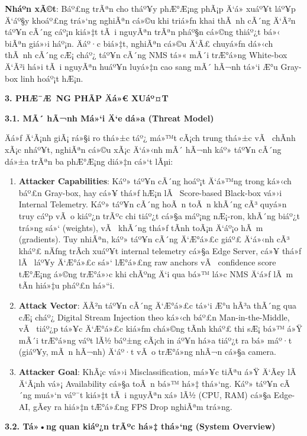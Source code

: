 \documentclass[]{article}
\begin{document}
\textbf{Nháº­n xÃ©t}: Báº£ng trÃªn cho tháº¥y phÆ°Æ¡ng phÃ¡p Ä‘á» xuáº¥t láº¥p Ä‘áº§y khoáº£ng
trá»‘ng nghiÃªn cá»©u khi triá»ƒn khai thÃ nh cÃ´ng Ä‘Ã²n táº¥n cÃ´ng cáº¡n kiá»‡t tÃ i
nguyÃªn trÃªn pháº§n cá»©ng thiáº¿t bá»‹ biÃªn giá»›i háº¡n. Äáº·c biá»‡t, nghiÃªn cá»©u Ä‘Ã£
chuyá»ƒn dá»‹ch thÃ nh cÃ´ng cÆ¡ cháº¿ táº¥n cÃ´ng NMS tá»« mÃ´i trÆ°á»ng White-box Ä‘Ã²i
há»i tÃ i nguyÃªn huáº¥n luyá»‡n cao sang mÃ´ hÃ¬nh tá»‘i Æ°u Gray-box
linh hoáº¡t hÆ¡n.\textbf{\hfill\break
}

\textbf{3. PHÆ¯Æ NG PHÃP Äá»€ XUáº¤T}

\textbf{3.1. MÃ´ hÃ¬nh Má»‘i Ä‘e dá»a (Threat Model)}

Äá»ƒ Ä‘Ã¡nh giÃ¡ rá»§i ro thá»±c táº¿ má»™t cÃ¡ch trung thá»±c vÃ  chÃ­nh xÃ¡c nháº¥t, nghiÃªn
cá»©u xÃ¡c Ä‘á»‹nh mÃ´ hÃ¬nh káº» táº¥n cÃ´ng dá»±a trÃªn ba phÆ°Æ¡ng diá»‡n cá»‘t lÃµi:

\begin{enumerate}
\def\labelenumi{\arabic{enumi}.}
\item
  \textbf{Attacker Capabilities}: Káº» táº¥n cÃ´ng hoáº¡t Ä‘á»™ng trong ká»‹ch báº£n 
  Gray-box, hay cá»¥ thá»ƒ hÆ¡n lÃ  Score-based Black-box vá»›i Internal Telemetry. 
  Káº» táº¥n cÃ´ng hoÃ n toÃ n khÃ´ng cÃ³ quyá»n truy cáº­p vÃ o kiáº¿n trÃºc chi tiáº¿t cá»§a 
  máº¡ng nÆ¡-ron, khÃ´ng biáº¿t trá»ng sá»‘ (weights), vÃ  khÃ´ng thá»ƒ tÃ­nh toÃ¡n Ä‘áº¡o hÃ m
  (gradients). Tuy nhiÃªn, káº» táº¥n cÃ´ng Ä‘Æ°á»£c giáº£ Ä‘á»‹nh cÃ³ kháº£ nÄƒng trÃ­ch
  xuáº¥t internal telemetry cá»§a Edge Server, cá»¥ thá»ƒ lÃ  láº¥y Ä‘Æ°á»£c sá»‘ lÆ°á»£ng 
  raw anchors vÃ  confidence score tÆ°Æ¡ng á»©ng trÆ°á»›c khi chÃºng Ä‘i qua bá»™ lá»c 
  NMS Ä‘á»ƒ lÃ m tÃ­n hiá»‡u pháº£n há»“i.
\item
  \textbf{Attack Vector}: ÄÃ²n táº¥n cÃ´ng Ä‘Æ°á»£c tá»‘i Æ°u
  hÃ³a thÃ´ng qua cÆ¡ cháº¿ Digital Stream Injection theo
  ká»‹ch báº£n Man-in-the-Middle, vÃ  tiáº¿p tá»¥c Ä‘Æ°á»£c kiá»ƒm chá»©ng tÃ­nh kháº£ thi
  sÆ¡ bá»™ á»Ÿ mÃ´i trÆ°á»ng váº­t lÃ½ báº±ng cÃ¡ch in áº¥n há»a tiáº¿t ra bá» máº·t (giáº¥y,
  mÃ n hÃ¬nh) Ä‘áº·t vÃ o trÆ°á»ng nhÃ¬n cá»§a camera.
\item
  \textbf{Attacker Goal}: KhÃ¡c vá»›i Misclassification, má»¥c tiÃªu á»Ÿ Ä‘Ã¢y lÃ  
  Ä‘Ã¡nh vá»¡ Availability cá»§a toÃ n bá»™ há»‡ thá»‘ng. Káº» táº¥n cÃ´ng muá»‘n váº¯t kiá»‡t tÃ i
  nguyÃªn xá»­ lÃ½ (CPU, RAM) cá»§a Edge-AI, gÃ¢y ra hiá»‡n tÆ°á»£ng FPS Drop nghiÃªm trá»ng.
\end{enumerate}

\textbf{3.2. Tá»•ng quan kiáº¿n trÃºc há»‡ thá»‘ng (System Overview)}
\end{document}
